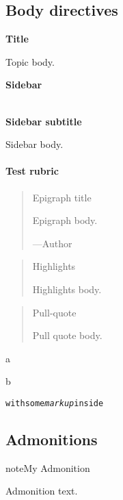 \documentclass[letterpaper,10pt,english]{sphinxmanual}
\begin{document}
\subsection{Body directives}
\label{markup:body-directives}
\begin{SphinxShadowBox}
\textbf{Title}

\medskip


Topic body.
\end{SphinxShadowBox}

\begin{SphinxShadowBox}
\textbf{Sidebar}

\medskip

~\\
\textbf{Sidebar subtitle}
\smallskip

Sidebar body.
\end{SphinxShadowBox}
\paragraph{Test rubric}
\begin{quote}

Epigraph title

Epigraph body.

\begin{flushright}
---Author
\end{flushright}
\end{quote}
\begin{quote}

Highlights

Highlights body.
\end{quote}
\begin{quote}

Pull-quote

Pull quote body.
\end{quote}

a

b
\begin{alltt}
with some \emph{markup} inside
\end{alltt}


\subsection{Admonitions}
\label{markup:admonitions}\label{markup:admonition-section}
\begin{notice}{note}{My Admonition}

Admonition text.
\end{notice}
\end{document}
